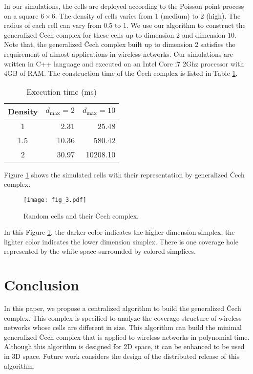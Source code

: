 \documentclass[conference]{IEEEtran}
\begin{document}
In our simulations, the cells are deployed according to the Poisson point process on a square $6\times 6$. The density of cells varies from 1 (medium) to 2 (high). The radius of each cell can vary from 0.5 to 1. We use our algorithm to construct the generalized \v{C}ech complex for these cells up to dimension 2 and dimension 10. Note that, the generalized \v{C}ech complex built up to dimension 2 satisfies the requirement of almost applications in wireless networks. Our simulations are written in C++ language and executed on an Intel Core i7 2Ghz processor with 4GB of RAM.
The construction time of the \v{C}ech complex is listed in Table \ref{table:time}.
\begin{table}[H]\caption{Execution time (ms)}
\label{table:time}
\begin{center}
\begin{tabular}{|c|r|r|}
\hline
Density &$d_{\text{max}}=2$	&$d_{\text{max}}=10$\\
\hline
		1	&2.31	&25.48\\
		1.5	&10.36	&580.42	\\
		2	&30.97	&10208.10 \\
\hline
\end{tabular}
\end{center}
\end{table}
Figure \ref{fig:representation} shows the simulated cells with their representation by generalized \v{C}ech complex. 
\begin{figure}[H]
\centering
\texttt{[image: fig\_3.pdf]}
\hfill
\caption{Random cells and their \v{C}ech complex.}
\label{fig:representation}
\end{figure}
In this Figure \ref{fig:representation}, the darker color indicates the higher dimension simplex, the lighter color indicates the lower dimension simplex. There is one coverage hole represented by the white space surrounded by colored simplices.


\section{Conclusion}
In this paper, we propose a centralized algorithm to build the generalized \v{C}ech complex. This complex is specified to analyze the coverage structure of wireless networks whose cells are different in size. This algorithm can build the minimal generalized \v{C}ech complex that is applied to wireless networks in polynomial time. Although this algorithm is designed for 2D space, it can be enhanced to be used in 3D space. Future work considers the design of the distributed release of this algorithm.











\end{document}

